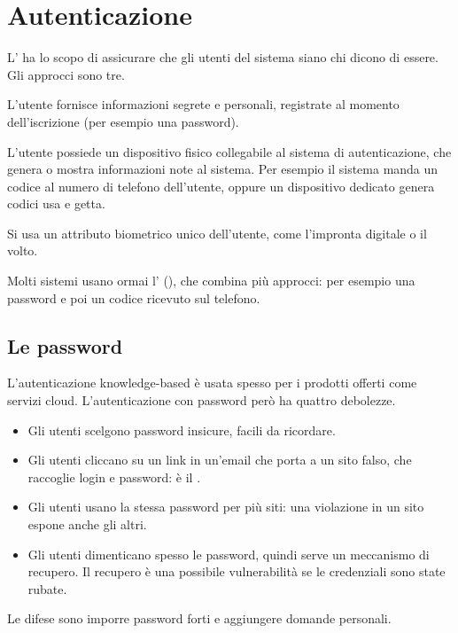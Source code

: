 \section{Autenticazione}
\label{sec:sic-autenticazione}

L' ha lo scopo di assicurare che gli utenti del sistema siano chi dicono di essere. Gli
approcci sono tre.
\begin{description}[leftmargin=0pt, style=unboxed]
  \item[Knowledge-based.] L'utente fornisce informazioni segrete e personali, registrate al momento dell'iscrizione
    (per esempio una password).
  \item[Possession-based.] L'utente possiede un dispositivo fisico collegabile al sistema di autenticazione, che genera
    o mostra informazioni note al sistema. Per esempio il sistema manda un codice al numero di telefono dell'utente,
    oppure un dispositivo dedicato genera codici usa e getta.
  \item[Attribute-based.] Si usa un attributo biometrico unico dell'utente, come l'impronta digitale o il volto.
\end{description}
Molti sistemi usano ormai l' (), che combina
più approcci: per esempio una password e poi un codice ricevuto sul telefono.

\subsection{Le password}

L'autenticazione knowledge-based è usata spesso per i prodotti offerti come servizi cloud. L'autenticazione con
password però ha quattro debolezze.
\begin{itemize}
  \item Gli utenti scelgono password insicure, facili da ricordare.
  \item Gli utenti cliccano su un link in un'email che porta a un sito falso, che raccoglie login e password: è il
    .
  \item Gli utenti usano la stessa password per più siti: una violazione in un sito espone anche gli altri.
  \item Gli utenti dimenticano spesso le password, quindi serve un meccanismo di recupero. Il recupero è una possibile
    vulnerabilità se le credenziali sono state rubate.
\end{itemize}
Le difese sono imporre password forti e aggiungere domande personali.

